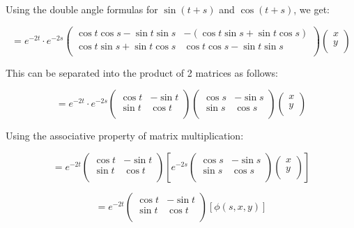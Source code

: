 \documentclass[12pt,letterpaper,reqno]{amsart}
\begin{document}
\begin{enumerate}
\begin{enumerate}
Using the double angle formulas for $\sin{(t+s)}$ and $\cos{(t+s)}$, we get:

$$= e^{-2t}\cdot e^{-2s}
\begin{pmatrix}
  \cos{t}\cos{s}-\sin{t}\sin{s} & -(\cos{t}\sin{s}+\sin{t}\cos{s}) \\
  \cos{t}\sin{s}+\sin{t}\cos{s} & \cos{t}\cos{s}-\sin{t}\sin{s} \\
\end{pmatrix}
\begin{pmatrix}
  x \\
  y \\
\end{pmatrix}
$$

This can be separated into the product of 2 matrices as follows:

$$= e^{-2t}\cdot e^{-2s}
\begin{pmatrix}
  \cos{t} & -\sin{t} \\
  \sin{t} & \cos{t} \\
\end{pmatrix}
\begin{pmatrix}
  \cos{s} & -\sin{s} \\
  \sin{s} & \cos{s} \\
\end{pmatrix}
\begin{pmatrix}
  x \\
  y \\
\end{pmatrix}$$

Using the associative property of matrix multiplication:

$$= e^{-2t}
\begin{pmatrix}
  \cos{t} & -\sin{t} \\
  \sin{t} & \cos{t} \\
\end{pmatrix}
\left[e^{-2s}
\begin{pmatrix}
  \cos{s} & -\sin{s} \\
  \sin{s} & \cos{s} \\
\end{pmatrix}
\begin{pmatrix}
  x \\
  y \\
\end{pmatrix}
\right]$$

$$= e^{-2t}
\begin{pmatrix}
  \cos{t} & -\sin{t} \\
  \sin{t} & \cos{t} \\
\end{pmatrix}
[
\phi(s,x,y)
]$$


\end{enumerate}
\end{enumerate}
\end{document}
